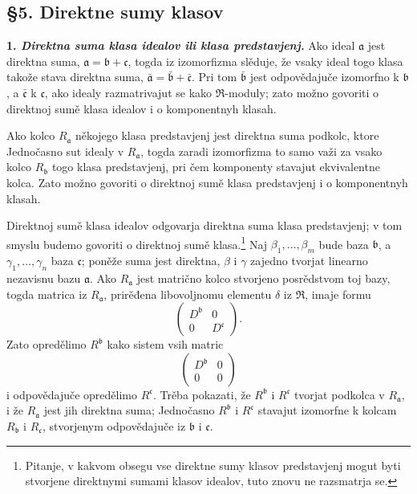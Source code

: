 \documentclass[11pt]{article}
\begin{document}
\setcounter{footnote}{26}

\subsection*{§5. Direktne sumy klasov}

\textbf{1. \emph{Direktna suma klasa idealov ili klasa predstavjenj.}} Ako ideal $\mathfrak a$ jest direktna suma, $\mathfrak a=\mathfrak b+\mathfrak c$, togda iz izomorfizma slěduje, že vsaky ideal togo klasa takože stava direktna suma,
$\bar{\mathfrak a}=\bar{\mathfrak b}+\bar{\mathfrak c}$. Pri tom $\bar{\mathfrak b}$ jest odpovědajuče izomorfno k $\mathfrak b$, a $\bar{\mathfrak c}$ k $\mathfrak c$, ako idealy razmatrivajut se kako $\mathfrak R$-moduly; zato možno govoriti o direktnoj sumě klasa idealov i o komponentnyh klasah.

Ako kolco $R_{\mathfrak a}$ někojego klasa predstavjenj jest direktna suma podkolc, ktore Jednočasno sut idealy v $R_{\mathfrak a}$, togda zaradi izomorfizma to samo važi za vsako kolco $R_{\mathfrak b}$ togo klasa predstavjenj, pri čem komponenty stavajut ekvivalentne kolca. Zato možno govoriti o direktnoj sumě klasa predstavjenj i o komponentnyh klasah.

Direktnoj sumě klasa idealov odgovarja direktna suma klasa predstavjenj; v tom smyslu budemo govoriti o direktnoj sumě klasa.\footnote{Pitanje, v kakvom obsegu vse direktne sumy klasov predstavjenj mogut byti stvorjene direktnymi sumami klasov idealov, tuto znovu ne razsmatrja se.} Naj $\beta_1,\ldots,\beta_m$ bude baza $\mathfrak b$, a $\gamma_1,\ldots,\gamma_n$ baza $\mathfrak c$; poněže suma jest direktna, $\beta$ i $\gamma$ zajedno tvorjat linearno nezavisnu bazu $\mathfrak a$. Ako $R_{\mathfrak a}$ jest matrično kolco stvorjeno posrědstvom toj bazy, togda matrica iz $R_{\mathfrak a}$, prirěđena libovoljnomu elementu $\delta$ iz $\mathfrak R$, imaje formu
\[
        \begin{pmatrix}D^{\mathfrak b}&0\\0&D^{\mathfrak c}\end{pmatrix}.
\]
Zato opredělimo $R^{\mathfrak b}$ kako sistem vsih matric
\[
        \begin{pmatrix}D^{\mathfrak b}&0\\0&0\end{pmatrix}
\]
i odpovědajuče opredělimo $R^{\mathfrak c}$. Trěba pokazati, že $R^{\mathfrak b}$ i $R^{\mathfrak c}$ tvorjat podkolca v $R_{\mathfrak a}$, i že $R_{\mathfrak a}$ jest jih direktna suma; Jednočasno $R^{\mathfrak b}$ i $R^{\mathfrak c}$ stavajut izomorfne k kolcam $R_{\mathfrak b}$ i $R_{\mathfrak c}$, stvorjenym odpovědajuče iz $\mathfrak b$ i $\mathfrak c$.
\end{document}
